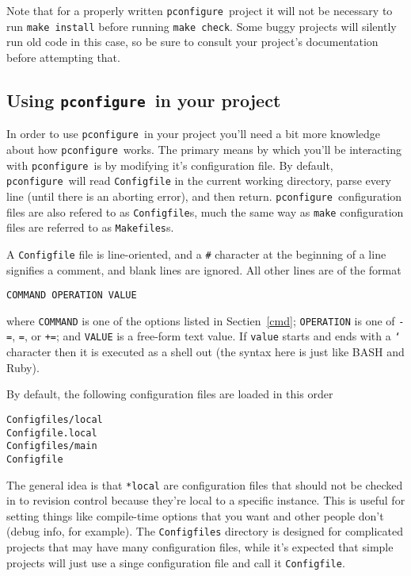 \documentclass{article}
\newcommand{\pconfigure}{\texttt{pconfigure}}
\begin{document}
Note that for a properly written \pconfigure\ project it will not be
necessary to run \texttt{make install} before running \texttt{make
  check}.  Some buggy projects will silently run old code in this
case, so be sure to consult your project's documentation before
attempting that.

\subsection{Using \pconfigure\ in your project}

In order to use \pconfigure\ in your project you'll need a bit more
knowledge about how \pconfigure\ works.  The primary means by which
you'll be interacting with \pconfigure\ is by modifying it's
configuration file.  By default, \pconfigure\ will read
\texttt{Configfile} in the current working directory, parse every line
(until there is an aborting error), and then return.
\pconfigure\ configuration files are also refered to as
\texttt{Configfile}s, much the same way as \texttt{make} configuration
files are referred to as \texttt{Makefiles}s.

A \texttt{Configfile} file is line-oriented, and a \texttt{\#}
character at the beginning of a line signifies a comment, and blank
lines are ignored.  All other lines are of the format
\begin{verbatim}
COMMAND OPERATION VALUE
\end{verbatim}
where \texttt{COMMAND} is one of the options listed in
Sectien~\ref{cmd}; \texttt{OPERATION} is one of \texttt{-=},
\texttt{=}, or \texttt{+=}; and \texttt{VALUE} is a free-form text
value.  If \texttt{value} starts and ends with a \texttt{`} character
then it is executed as a shell out (the syntax here is just like BASH
and Ruby).

By default, the following configuration files are loaded in this order
\begin{verbatim}
Configfiles/local
Configfile.local
Configfiles/main
Configfile
\end{verbatim}
The general idea is that \texttt{*local} are configuration files that
should not be checked in to revision control because they're local to
a specific instance.  This is useful for setting things like
compile-time options that you want and other people don't (debug info,
for example).  The \texttt{Configfiles} directory is designed for
complicated projects that may have many configuration files, while
it's expected that simple projects will just use a singe configuration
file and call it \texttt{Configfile}.
\end{document}

